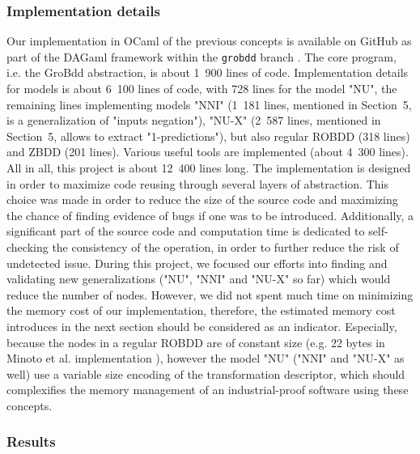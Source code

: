 \documentclass[a4paper,10pt]{article}
\begin{document}
\subsubsection{Implementation details}
Our implementation in OCaml of the previous concepts is available on GitHub as part of the DAGaml framework within the \texttt{grobdd} branch \cite{DAGamlGitHub}.
The core program, i.e. the GroBdd abstraction, is about 1~900 lines of code.
Implementation details for models is about 6~100 lines of code, with 728 lines for the model "NU", the remaining lines implementing models "NNI" (1~181 lines, mentioned in Section~5, is a generalization of "inputs negation"), "NU-X" (2~587 lines, mentioned in Section~5, allows to extract "1-predictions"), but also regular ROBDD (318 lines) and ZBDD (201 lines).
Various useful tools are implemented (about 4~300 lines).
All in all, this project is about 12~400 lines long.
The implementation is designed in order to maximize code reusing through several layers of abstraction.
This choice was made in order to reduce the size of the source code and maximizing the chance of finding evidence of bugs if one was to be introduced.
Additionally, a significant part of the source code and computation time is dedicated to self-checking the consistency of the operation, in order to further reduce the risk of undetected issue.
During this project, we focused our efforts into finding and validating new generalizations ("NU", "NNI" and "NU-X" so far) which would reduce the number of nodes.
However, we did not spent much time on minimizing the memory cost of our implementation, therefore, the estimated memory cost introduces in the next section should be considered as an indicator.
Especially, because the nodes in a regular ROBDD are of constant size (e.g. 22 bytes in Minoto et al. implementation \cite{MinatoVariants}), however the model "NU" ("NNI" and "NU-X" as well) use a variable size encoding of the transformation descriptor, which should complexifies the memory management of an industrial-proof software using these concepts.

\subsubsection{Results}
\end{document}
